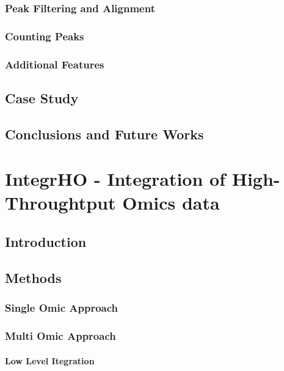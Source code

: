 \documentclass[b5paper,oneside,british,intoc,bibliograph=totoc,index=totoc,BCOR10mm,twoside,openright]{book}
\numberwithin{equation}{section}
\numberwithin{figure}{section}
\begin{document}
\subsection{Peak Filtering and Alignment} \label{sec:descan2filtering}


\subsection{Counting Peaks} \label{sec:descan2peakcounts}


\subsection{Additional Features} \label{sec:descan2addfeat}


\section{Case Study} \label{sec:descan2results}


\section{Conclusions and Future Works} \label{sec:descan2next}


\chapter{IntegrHO - Integration of High-Throughtput Omics data}
\section{Introduction}
\section{Methods}
\subsection{Single Omic Approach}
\subsection{Multi Omic Approach}
\subsubsection{Low Level Itegration}
\end{document}
